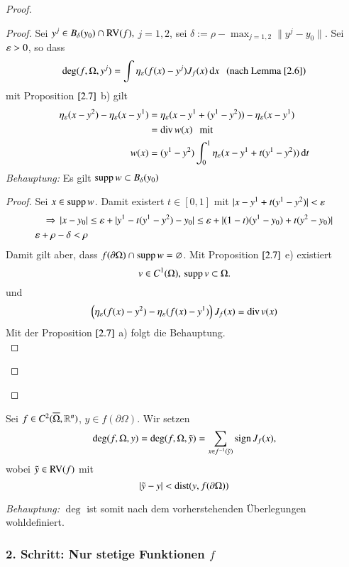 \begin{proof}
\begin{description}
    \begin{proof}
        Sei $y^j\in B_\delta (y_0)\cap \mathrm{RV}(f),$ $j=1,2$, sei $\delta := \rho-\max_{j=1,2}\|y^j-y_0\|$.
        Sei $\varepsilon>0$, so dass
        \[
            \deg(f,\Omega,y^j)=\int \eta_\varepsilon(f(x)-y^j)J_f(x) \, \mathrm{d} x \hspace{.25cm} \text{(nach Lemma $\ref{2.6}$)}
        \]
        mit Proposition $\ref{2.7}$ b) gilt
        \begin{align*}
            \eta_\varepsilon(x-y^2)-\eta_\varepsilon(x-y^1)&= \eta_\varepsilon (x-y^1+(y^1-y^2))-\eta_\varepsilon(x-y^1)\\
            &= \mathrm{div}\, w(x) \hspace{.25cm}\text{mit}\\
            w(x)&= (y^1-y^2)\int_0^1 \eta_\varepsilon (x-y^1+t(y^1-y^2))\, \mathrm{d} t
        \end{align*}
    \textit{Behauptung:} Es gilt $\mathrm{supp}\, w\subset B_\delta(y_0)$
    \begin{proof}
        Sei $x\in \mathrm{supp}\, w$. Damit existert $t\in [0,1]$ mit $|x-y^1+t(y^1-y^2)|<\varepsilon$
        \begin{align*}
            \Rightarrow \, |x-y_0|&\leq \varepsilon + |y^1-t(y^1-y^2)-y_0|\leq \varepsilon +|(1-t)(y^1-y_0)+t(y^2-y_0)|\\
                \varepsilon + \rho-\delta<\rho
        \end{align*}
        Damit gilt aber, dass $f(\partial \Omega)\cap \mathrm{supp}\, w=\varnothing$. Mit Proposition 
        $\ref{2.7}$ e) existiert
        \[
            v\in C^1(\Omega),\, \mathrm{supp}\, v \subset \Omega.
        \]
        und
        \[
            \left( \eta_\varepsilon(f(x)-y^2)-\eta_\varepsilon (f(x)-y^1) \right)J_f(x)=\mathrm{div}\, v(x)
        \]
        Mit der Proposition $\ref{2.7}$ a) folgt die Behauptung. \[  \]
    \end{proof}

    \end{proof}
    \end{description}
\end{proof}

\begin{defi}\label{2.9}
    Sei $f\in C^2(\overline \Omega,\mathbb{R}^n)$, $y\in f(\partial \Omega)$. Wir setzen
    \[
        \deg (f,\Omega,y)= \deg(f,\Omega,\tilde y)=\sum_{x\in f^{-1}(\tilde y)} \mathrm{sign}\, J_f(x),
    \]
    wobei $\tilde y \in \mathrm{RV}(f)$ mit
    \[
        |\tilde y- y| < \mathrm{dist}(y,f(\partial \Omega))
    \]
\end{defi}

\textit{Behauptung:} $\deg$ ist somit nach dem vorherstehenden Überlegungen wohldefiniert.
\subsubsection*{2. Schritt: Nur stetige Funktionen $f$}

